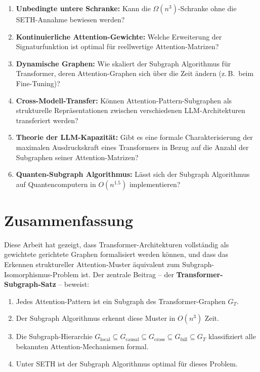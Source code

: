 ﻿\documentclass[a4paper,12pt]{article}
\theoremstyle{definition}
\begin{document}
\begin{enumerate}
	\item \textbf{Unbedingte untere Schranke:} Kann die $\Omega(n^3)$-Schranke
	ohne die SETH-Annahme bewiesen werden?

	\item \textbf{Kontinuierliche Attention-Gewichte:} Welche Erweiterung
	der Signaturfunktion ist optimal für reellwertige Attention-Matrizen?

	\item \textbf{Dynamische Graphen:} Wie skaliert der Subgraph Algorithmus
	für Transformer, deren Attention-Graphen sich über die Zeit ändern
	(z.\,B.\ beim Fine-Tuning)?

	\item \textbf{Cross-Modell-Transfer:} Können Attention-Pattern-Subgraphen
	als strukturelle Repräsentationen zwischen verschiedenen LLM-Architekturen
	transferiert werden?

	\item \textbf{Theorie der LLM-Kapazität:} Gibt es eine formale
	Charakterisierung der maximalen Ausdruckskraft eines Transformers
	in Bezug auf die Anzahl der Subgraphen seiner Attention-Matrizen?

	\item \textbf{Quanten-Subgraph Algorithmus:} Lässt sich der Subgraph
	Algorithmus auf Quantencomputern in $O(n^{1.5})$ implementieren?
\end{enumerate}

\section{Zusammenfassung}

Diese Arbeit hat gezeigt, dass Transformer-Architekturen vollständig als
gewichtete gerichtete Graphen formalisiert werden können, und dass das
Erkennen struktureller Attention-Muster äquivalent zum Subgraph-Isomorphismus-Problem
ist. Der zentrale Beitrag -- der \textbf{Transformer-Subgraph-Satz} --
beweist:

\begin{enumerate}
	\item Jedes Attention-Pattern ist ein Subgraph des Transformer-Graphen $G_T$.
	\item Der Subgraph Algorithmus erkennt diese Muster in $O(n^3)$ Zeit.
	\item Die Subgraph-Hierarchie
	$G_{\mathrm{local}} \subseteq G_{\mathrm{causal}} \subseteq G_{\mathrm{cross}} \subseteq G_{\mathrm{full}} \subseteq G_T$
	klassifiziert alle bekannten Attention-Mechanismen formal.
	\item Unter SETH ist der Subgraph Algorithmus optimal für dieses Problem.
\end{enumerate}
\end{document}
